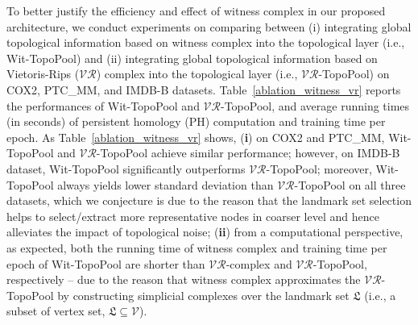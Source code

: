 \documentclass[letterpaper]{article} %
\begin{document}
To better justify the efficiency and effect of witness complex in our proposed architecture, we conduct experiments on comparing between (i) integrating global topological information based on witness complex into the topological layer (i.e., Wit-TopoPool) and (ii) integrating global topological information based on Vietoris-Rips ($\mathcal{VR}$) complex into the topological layer (i.e., $\mathcal{VR}$-TopoPool) on COX2, PTC\_MM, and IMDB-B datasets. Table~\ref{ablation_witness_vr} reports the performances of Wit-TopoPool and $\mathcal{VR}$-TopoPool, and average running times (in seconds) of persistent homology (PH) computation and training time per epoch. As Table~\ref{ablation_witness_vr} shows, ({\bf i}) on COX2 and PTC\_MM, Wit-TopoPool and  $\mathcal{VR}$-TopoPool achieve similar performance; however, on IMDB-B dataset, Wit-TopoPool significantly outperforms $\mathcal{VR}$-TopoPool; moreover, Wit-TopoPool always yields lower standard deviation than $\mathcal{VR}$-TopoPool on all three datasets, which we conjecture is due to the reason that the landmark set selection helps to select/extract more representative nodes in coarser level and hence alleviates the impact of topological noise;
({\bf ii}) from a computational perspective, as expected, both the running time of witness complex and training time per epoch of Wit-TopoPool are shorter than $\mathcal{VR}$-complex and $\mathcal{VR}$-TopoPool, respectively -- due to the reason that witness complex approximates the $\mathcal{VR}$-TopoPool by constructing simplicial complexes over the landmark set $\mathfrak{L}$ (i.e., a subset of vertex set, $\mathfrak{L} \subseteq \mathcal{V}$).

\begin{table}[h!]
\centering
\setlength{}
\caption{Comparisons of witness complex vs. $\mathcal{VR}$-complex. PH means persistent homology.\label{ablation_witness_vr}}
\end{table}
\end{document}

